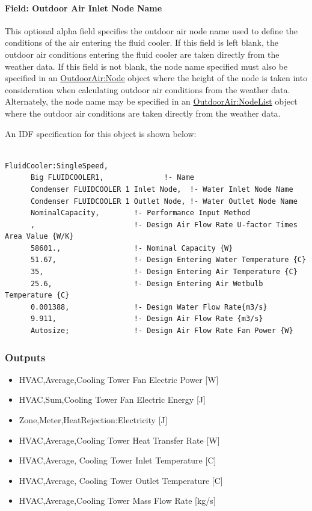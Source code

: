 \paragraph{Field: Outdoor Air Inlet Node Name}\label{field-outdoor-air-inlet-node-name-6}

This optional alpha field specifies the outdoor air node name used to define the conditions of the air entering the fluid cooler. If this field is left blank, the outdoor air conditions entering the fluid cooler are taken directly from the weather data. If this field is not blank, the node name specified must also be specified in an \hyperref[outdoorairnode]{OutdoorAir:Node} object where the height of the node is taken into consideration when calculating outdoor air conditions from the weather data. Alternately, the node name may be specified in an \hyperref[outdoorairnodelist]{OutdoorAir:NodeList} object where the outdoor air conditions are taken directly from the weather data.

An IDF specification for this object is shown below:

\begin{lstlisting}

FluidCooler:SingleSpeed,
      Big FLUIDCOOLER1,              !- Name
      Condenser FLUIDCOOLER 1 Inlet Node,  !- Water Inlet Node Name
      Condenser FLUIDCOOLER 1 Outlet Node, !- Water Outlet Node Name
      NominalCapacity,        !- Performance Input Method
      ,                       !- Design Air Flow Rate U-factor Times Area Value {W/K}
      58601.,                 !- Nominal Capacity {W}
      51.67,                  !- Design Entering Water Temperature {C}
      35,                     !- Design Entering Air Temperature {C}
      25.6,                   !- Design Entering Air Wetbulb Temperature {C}
      0.001388,               !- Design Water Flow Rate{m3/s}
      9.911,                  !- Design Air Flow Rate {m3/s}
      Autosize;               !- Design Air Flow Rate Fan Power {W}
\end{lstlisting}

\subsubsection{Outputs}\label{outputs-8-000}

\begin{itemize}
\item
  HVAC,Average,Cooling Tower Fan Electric Power {[}W{]}
\item
  HVAC,Sum,Cooling Tower Fan Electric Energy {[}J{]}
\item
  Zone,Meter,HeatRejection:Electricity {[}J{]}
\item
  HVAC,Average,Cooling Tower Heat Transfer Rate {[}W{]}
\item
  HVAC,Average, Cooling Tower Inlet Temperature {[}C{]}
\item
  HVAC,Average, Cooling Tower Outlet Temperature {[}C{]}
\item
  HVAC,Average,Cooling Tower Mass Flow Rate {[}kg/s{]}
\end{itemize}

